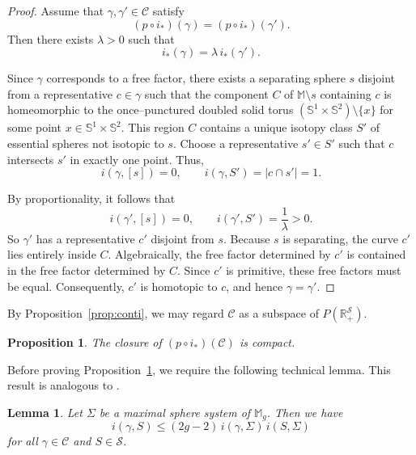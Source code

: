 \documentclass[12pt,a4paper]{amsart}
\numberwithin{equation}{section}
\newcommand{\MM}{\mathbb{M}}
\theoremstyle{plain}
\newtheorem{proposition}[theorem]{Proposition}
\newtheorem{lemma}[theorem]{Lemma}
\theoremstyle{definition}
\theoremstyle{remark}
\begin{document}
\begin{proof}
    Assume that \(\gamma, \gamma' \in \mathcal{C}\) satisfy  
    \[
    (p \circ i_*)(\gamma) = (p \circ i_*)(\gamma').
    \]
    Then there exists \(\lambda > 0\) such that  
    \[
    i_*(\gamma) = \lambda \, i_*(\gamma').
    \]
    
    Since \(\gamma\) corresponds to a free factor, there exists a separating sphere \(s\) disjoint from a representative \(c \in \gamma\) such that the component \(C\) of \(\MM \setminus s\) containing \(c\) is homeomorphic to the once--punctured doubled solid torus $(\mathbb{S}^1 \times \mathbb{S}^2)\setminus \{x\}$ for some point \(x \in \mathbb{S}^1 \times \mathbb{S}^2\).
    This region \(C\) contains a unique isotopy class \(S'\) of essential spheres not isotopic to \(s\).  
    Choose a representative \(s' \in S'\) such that \(c\) intersects \(s'\) in exactly one point.  
    Thus,
    \[
    i(\gamma,[s]) = 0, \qquad i(\gamma, S') = \lvert c \cap s' \rvert = 1.
    \]
    
    By proportionality, it follows that  
    \[
    i(\gamma', [s]) = 0, \qquad i(\gamma', S') = \frac{1}{\lambda} > 0.
    \]
    So \(\gamma'\) has a representative \(c'\) disjoint from \(s\).  
    Because \(s\) is separating, the curve \(c'\) lies entirely inside \(C\).  
    Algebraically, the free factor determined by \(c'\) is contained in the free factor determined by \(C\).  
    Since \(c'\) is primitive, these free factors must be equal.  
    Consequently, \(c'\) is homotopic to \(c\), and hence \(\gamma = \gamma'\).
\end{proof}

By Proposition~\ref{prop:conti}, we may regard \(\mathcal{C}\) as a subspace of \(P(\mathbb{R}_+^{\mathcal{S}})\).

\begin{proposition} \label{prop:C_compact}
    The closure of $(p \circ i_*)(\mathcal{C})$ is compact.
\end{proposition}

Before proving Proposition~\ref{prop:C_compact}, we require the following technical lemma. This result is analogous to \cite[Lemma~4.2]{MR3053012}.

\begin{lemma} \label{lem:bounded}
    Let $\Sigma$ be a maximal sphere system of $\MM_g$.
    Then we have \[i(\gamma, S) \leq (2g-2) \, i(\gamma, \Sigma) \, i(S, \Sigma) \] for all $\gamma \in \mathcal{C}$ and $S \in \mathcal{S}$.
\end{lemma}
\end{document}
